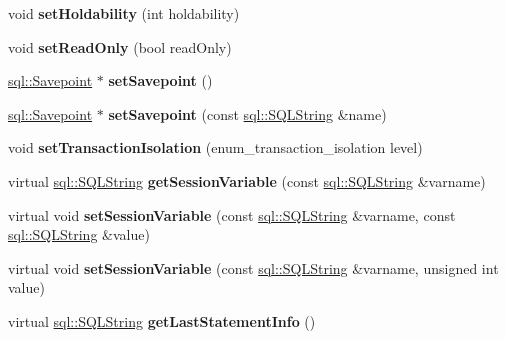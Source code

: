 \begin{DoxyCompactItemize}
\item 
\hypertarget{classsql_1_1mysql_1_1_my_s_q_l___connection_a4703a47ce23ba73ec2fadfc680b2e868}{}\label{classsql_1_1mysql_1_1_my_s_q_l___connection_a4703a47ce23ba73ec2fadfc680b2e868} 
void {\bfseries set\+Holdability} (int holdability)
\item 
\hypertarget{classsql_1_1mysql_1_1_my_s_q_l___connection_ac4bafbedfb801fa73694ddbfca4a95c6}{}\label{classsql_1_1mysql_1_1_my_s_q_l___connection_ac4bafbedfb801fa73694ddbfca4a95c6} 
void {\bfseries set\+Read\+Only} (bool read\+Only)
\item 
\hypertarget{classsql_1_1mysql_1_1_my_s_q_l___connection_afca8998459c9f06788b3ed3be25b81de}{}\label{classsql_1_1mysql_1_1_my_s_q_l___connection_afca8998459c9f06788b3ed3be25b81de} 
\hyperlink{classsql_1_1_savepoint}{sql\+::\+Savepoint} $\ast$ {\bfseries set\+Savepoint} ()
\item 
\hypertarget{classsql_1_1mysql_1_1_my_s_q_l___connection_a2d0045db252b83fd0222e716f9bfc71d}{}\label{classsql_1_1mysql_1_1_my_s_q_l___connection_a2d0045db252b83fd0222e716f9bfc71d} 
\hyperlink{classsql_1_1_savepoint}{sql\+::\+Savepoint} $\ast$ {\bfseries set\+Savepoint} (const \hyperlink{classsql_1_1_s_q_l_string}{sql\+::\+S\+Q\+L\+String} \&name)
\item 
\hypertarget{classsql_1_1mysql_1_1_my_s_q_l___connection_a50c5f85205c2333804ee503778ed05b0}{}\label{classsql_1_1mysql_1_1_my_s_q_l___connection_a50c5f85205c2333804ee503778ed05b0} 
void {\bfseries set\+Transaction\+Isolation} (enum\+\_\+transaction\+\_\+isolation level)
\item 
\hypertarget{classsql_1_1mysql_1_1_my_s_q_l___connection_ae35fdfcee5de39dc2ec759bc5b8145be}{}\label{classsql_1_1mysql_1_1_my_s_q_l___connection_ae35fdfcee5de39dc2ec759bc5b8145be} 
virtual \hyperlink{classsql_1_1_s_q_l_string}{sql\+::\+S\+Q\+L\+String} {\bfseries get\+Session\+Variable} (const \hyperlink{classsql_1_1_s_q_l_string}{sql\+::\+S\+Q\+L\+String} \&varname)
\item 
\hypertarget{classsql_1_1mysql_1_1_my_s_q_l___connection_a5e3eb3eed3d7092c9d03efd7d52629c2}{}\label{classsql_1_1mysql_1_1_my_s_q_l___connection_a5e3eb3eed3d7092c9d03efd7d52629c2} 
virtual void {\bfseries set\+Session\+Variable} (const \hyperlink{classsql_1_1_s_q_l_string}{sql\+::\+S\+Q\+L\+String} \&varname, const \hyperlink{classsql_1_1_s_q_l_string}{sql\+::\+S\+Q\+L\+String} \&value)
\item 
\hypertarget{classsql_1_1mysql_1_1_my_s_q_l___connection_ad8a42ed4da0fb3810a7624cc969d7ced}{}\label{classsql_1_1mysql_1_1_my_s_q_l___connection_ad8a42ed4da0fb3810a7624cc969d7ced} 
virtual void {\bfseries set\+Session\+Variable} (const \hyperlink{classsql_1_1_s_q_l_string}{sql\+::\+S\+Q\+L\+String} \&varname, unsigned int value)
\item 
\hypertarget{classsql_1_1mysql_1_1_my_s_q_l___connection_a31744f8fd6beaa9c488f947962c1bae6}{}\label{classsql_1_1mysql_1_1_my_s_q_l___connection_a31744f8fd6beaa9c488f947962c1bae6} 
virtual \hyperlink{classsql_1_1_s_q_l_string}{sql\+::\+S\+Q\+L\+String} {\bfseries get\+Last\+Statement\+Info} ()
\end{DoxyCompactItemize}
